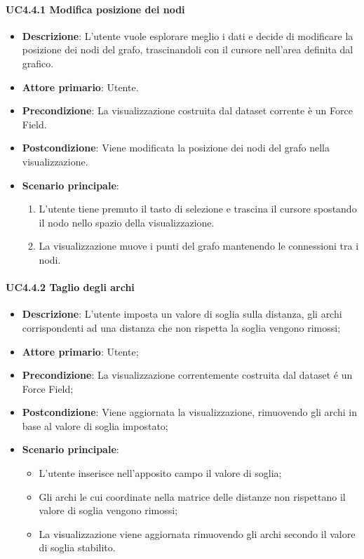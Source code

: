 \paragraph{UC4.4.1 Modifica posizione dei nodi}
\label{par:uc4.4.1}
\begin{itemize}
    \item \textbf{Descrizione}: L’utente vuole esplorare meglio i dati e decide di 
                                modificare la posizione dei nodi del grafo, trascinandoli con il 
                                cursore nell'area definita dal grafico.
	
    \item \textbf{Attore primario}: Utente.
    
    \item \textbf{Precondizione}:   La visualizzazione costruita dal dataset corrente è un Force Field.
    \item \textbf{Postcondizione}:  Viene modificata la posizione dei nodi del grafo nella visualizzazione.

	\item \textbf{Scenario principale}:
        \begin{enumerate}
            \item L'utente tiene premuto il tasto di selezione e trascina il cursore spostando il nodo nello spazio della visualizzazione.
            \item La visualizzazione muove i punti del grafo mantenendo le connessioni tra i nodi.
        \end{enumerate}
\end{itemize}

\paragraph{UC4.4.2 Taglio degli archi}
\label{par:uc4.4.2}
\begin{itemize}
    \item \textbf{Descrizione}:     L'utente imposta un valore di soglia sulla distanza, gli archi corrispondenti ad una distanza che non rispetta la soglia vengono rimossi;
    \item \textbf{Attore primario}: Utente;
    \item \textbf{Precondizione}:   La visualizzazione correntemente costruita dal dataset é un Force Field;
    \item \textbf{Postcondizione}:  Viene aggiornata la visualizzazione, rimuovendo gli archi in base al valore di soglia impostato;
    \item \textbf{Scenario principale}:
    \begin{itemize}
        \item L'utente inserisce nell'apposito campo il valore di soglia;
        \item Gli archi le cui coordinate nella matrice delle distanze non rispettano il valore di soglia vengono rimossi;
        \item La visualizzazione viene aggiornata rimuovendo gli archi secondo il valore di soglia stabilito.
    \end{itemize}
\end{itemize}

